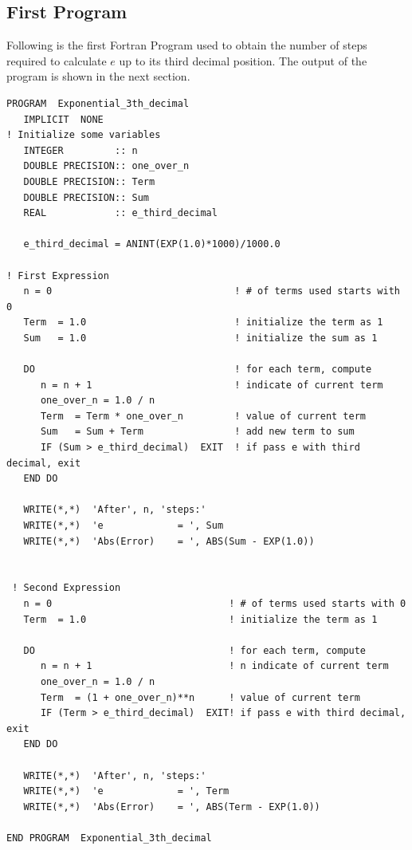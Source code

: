 \documentclass[11pt]{article}
\begin{document}
\subsection{First Program}
Following is the first Fortran Program used to obtain the number of steps required to calculate $e$ up to its third decimal position. The output of the program is shown in the next section. 
\begin{verbatim}
PROGRAM  Exponential_3th_decimal
   IMPLICIT  NONE
! Initialize some variables  
   INTEGER         :: n         
   DOUBLE PRECISION:: one_over_n    
   DOUBLE PRECISION:: Term
   DOUBLE PRECISION:: Sum      
   REAL            :: e_third_decimal
   
   e_third_decimal = ANINT(EXP(1.0)*1000)/1000.0
   
! First Expression
   n = 0                                ! # of terms used starts with 0
   Term  = 1.0                          ! initialize the term as 1
   Sum   = 1.0                          ! initialize the sum as 1

   DO                                   ! for each term, compute
      n = n + 1                         ! indicate of current term
      one_over_n = 1.0 / n
      Term  = Term * one_over_n         ! value of current term
      Sum   = Sum + Term                ! add new term to sum
      IF (Sum > e_third_decimal)  EXIT  ! if pass e with third decimal, exit
   END DO

   WRITE(*,*)  'After', n, 'steps:'
   WRITE(*,*)  'e             = ', Sum
   WRITE(*,*)  'Abs(Error)    = ', ABS(Sum - EXP(1.0))
   
   
 ! Second Expression
   n = 0                               ! # of terms used starts with 0
   Term  = 1.0                         ! initialize the term as 1
 
   DO                                  ! for each term, compute
      n = n + 1                        ! n indicate of current term
      one_over_n = 1.0 / n
      Term  = (1 + one_over_n)**n      ! value of current term
      IF (Term > e_third_decimal)  EXIT! if pass e with third decimal, exit
   END DO
   
   WRITE(*,*)  'After', n, 'steps:'
   WRITE(*,*)  'e             = ', Term
   WRITE(*,*)  'Abs(Error)    = ', ABS(Term - EXP(1.0))

END PROGRAM  Exponential_3th_decimal
\end{verbatim}
\end{document}
